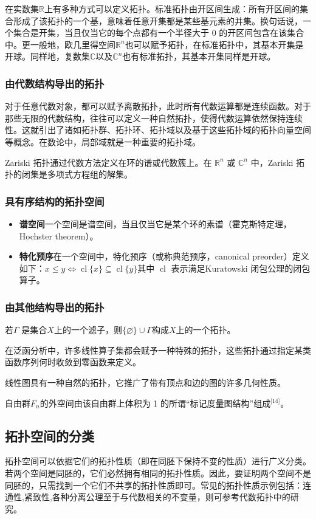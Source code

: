 在实数集$\mathbb{R}$上有多种方式可以定义拓扑。标准拓扑由开区间生成：所有开区间的集合形成了该拓扑的一个基，意味着任意开集都是某些基元素的并集。换句话说，一个集合是开集，当且仅当它的每个点都有一个半径大于 0 的开区间包含在该集合中。更一般地，欧几里得空间$\mathbb{R}^n$也可以赋予拓扑，在标准拓扑中，其基本开集是开球。同样地，复数集$\mathbb{C}$以及$\mathbb{C}^n$也有标准拓扑，其基本开集同样是开球。
\subsubsection{由代数结构导出的拓扑}
对于任意代数对象，都可以赋予离散拓扑，此时所有代数运算都是连续函数。对于那些无限的代数结构，往往可以定义一种自然拓扑，使得代数运算依然保持连续性。这就引出了诸如拓扑群、拓扑环、拓扑域以及基于这些拓扑域的拓扑向量空间等概念。在数论中，局部域就是一种重要的拓扑域。

Zariski 拓扑通过代数方法定义在环的谱或代数簇上。在 $\mathbb{R}^n$ 或 $\mathbb{C}^n$ 中，Zariski 拓扑的闭集是多项式方程组的解集。
\subsubsection{具有序结构的拓扑空间}
\begin{itemize}
\item \textbf{谱空间}一个空间是谱空间，当且仅当它是某个环的素谱（霍克斯特定理，Hochster theorem）。
\item \textbf{特化预序}在一个空间中，特化预序（或称典范预序，canonical preorder）定义如下：$x \leq y \iff \operatorname{cl}\{x\} \subseteq \operatorname{cl}\{y\}$其中 $\operatorname{cl}$ 表示满足Kuratowski 闭包公理的闭包算子。
\end{itemize}
\subsubsection{由其他结构导出的拓扑}

若$\Gamma$ 是集合$X$上的一个滤子，则$\{\varnothing\} \cup \Gamma$构成$X$上的一个拓扑。

在泛函分析中，许多线性算子集都会赋予一种特殊的拓扑，这些拓扑通过指定某类函数序列何时收敛到零函数来定义。

线性图具有一种自然的拓扑，它推广了带有顶点和边的图的许多几何性质。

自由群$F_n$的外空间由该自由群上体积为 1 的所谓“标记度量图结构”组成\(^\text{[14]}\)。
\subsection{拓扑空间的分类}
拓扑空间可以依据它们的拓扑性质（即在同胚下保持不变的性质）进行广义分类。若两个空间是同胚的，它们必然拥有相同的拓扑性质。因此，要证明两个空间不是同胚的，只需找到一个它们不共享的拓扑性质即可。常见的拓扑性质示例包括：连通性,紧致性,各种分离公理至于与代数相关的不变量，则可参考代数拓扑中的研究。
